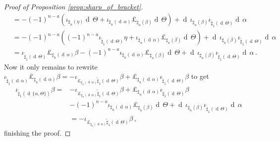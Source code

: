 \documentclass[10pt,a4paper]{amsart}
\newcommand{\dd}{\operatorname{d}\,}
\begin{document}
\begin{proof}[Proof of Proposition \ref{prop:sharp_of_bracket}]
\begin{align*}
    &= - (-1)^{n-a} \left( \iota_{\sharp_n(\eta)}  \dd \Theta + \iota_{\sharp_n(\dd \alpha)}  \pounds_{\sharp_n(\beta)} \dd \Theta\right)+\dd \iota_{\sharp_n(\beta)} \iota_{\widetilde \sharp_1(\dd \Theta)} \dd \alpha\\
    &= - (-1)^{n-a} \left( (-1)^{n-a} \iota_{\widetilde \sharp_1(\dd \Theta)} \eta + \iota_{\sharp_n(\dd \alpha)}  \pounds_{\sharp_n(\beta)} \dd \Theta\right) +\dd \iota_{\sharp_n(\beta)} \iota_{\widetilde \sharp_1(\dd \Theta)} \dd \alpha\\
    &=  \iota_{\widetilde \sharp_1(\dd \Theta)} \pounds_{\sharp_n(\dd \alpha)} \beta - (-1)^{n-a} \iota_{\sharp_n(\dd \alpha)} \pounds_{\sharp_n(\beta)} \dd \Theta + \dd \iota_{\sharp_n(\beta)} \iota_{\widetilde \sharp_1(\dd \Theta)} \dd \alpha \,.
\end{align*}
Now it only remains to rewrite $\iota_{\widetilde \sharp_1(\dd \alpha)} \pounds_{\sharp_n(\dd \alpha)} \beta =  -\iota_{\pounds_{\sharp_n(\dd \alpha)}\widetilde \sharp_1(\dd \Theta)} \beta +\pounds_{\sharp_n(\dd \alpha)}\iota_{\widetilde \sharp_1 (\dd \Theta)} \beta$ to get
\begin{align*}
    \iota_{\widetilde \sharp_1(\dd \{\alpha, \Theta\})} \beta =&- \iota_{\pounds_{\sharp_n(\dd \alpha)}\widetilde \sharp_1(\dd \Theta)} \beta + \pounds_{\sharp_n(\dd \alpha)}\iota_{\widetilde \sharp_1 (\dd \Theta)} \beta\\
    & - (-1)^{n-a} \iota_{\sharp_n(\dd \alpha)} \pounds_{\sharp_n(\beta)} \dd \Theta + \dd \iota_{\sharp_n(\beta)} \iota_{\widetilde \sharp_1(\dd \Theta)} \dd \alpha\\
    &= - \iota_{\pounds_{\sharp_n(\dd \alpha)}\widetilde \sharp_1(\dd \Theta)} \beta\,,
\end{align*}
finishing the proof.
\end{proof}
\end{document}
